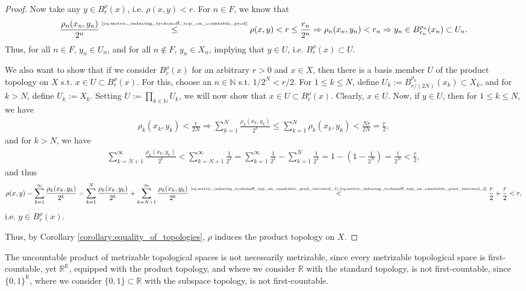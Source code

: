 \begin{proof}
	Now take any $y\in B_r^{\rho}(x)$, i.e. $\rho(x, y) < r$. For $n\in F$, we know that $$\frac{\rho_n(x_n, y_n) }{2^n} \overset{\tiny\eqref{eq:metric_inducing_tychonoff_top_on_countable_prod}}{\leq} \rho(x, y) < r \leq \frac{r_n}{2^n}\Rightarrow \rho_n(x_n, y_n) < r_n\Rightarrow y_n\in B_{r_n}^{\rho_n}(x_n) \subset U_n.$$
	Thus, for all $n\in F$, $y_n\in U_n$, and for all $n\notin F$, $y_n\in X_n$, implying that $y\in U$, i.e. $B_{r}^{\rho}(x)\subset U$.
	
	We also want to show that if we consider $B^{\rho}_{r}(x)$ for an arbitrary $r > 0$ and $x\in X$, then there is a basis member $U$ of the product topology on $X$ s.t. $x\in U\subset B^{\rho}_{r}(x)$. For this, choose an $n\in\mathbb N$ s.t. $1/2^N < r/2$. For $1\leq k\leq N$, define $U_k := B^{\rho_k}_{r/(2N)}(x_k) \subset X_k$, and for $k > N$, define $U_k := X_k$. Setting $U := \prod_{k\in \mathbb N}U_k$, we will now show that $x\in U\subset B^{\rho}_{r}(x)$. Clearly, $x\in U$. Now, if $y\in U$, then for $1\leq k\leq N$, we have
	\begin{align}\label{eq:metric_inducing_tychonoff_top_on_countable_prod_intermed_1}
		\rho_k(x_k, y_k) < \frac{r}{2N}\Rightarrow \sum_{k=1}^{N}\frac{\rho_k(x_k, y_k)}{2^k} \leq \sum_{k=1}^{N}\rho_k(x_k, y_k) < \frac{Nr}{2N} = \frac{r}{2},
	\end{align}
	and for $k > N$, we have 
	\begin{align}\label{eq:metric_inducing_tychonoff_top_on_countable_prod_intermed_2}
		\sum_{k = N + 1}^{\infty}\frac{\rho_k(x_k, y_k)}{2^k} < \sum_{k = N + 1}^{\infty}\frac{1}{2^k} = \sum_{k=1}^{\infty}\frac{1}{2^k} - \sum_{k=1}^{N}\frac{1}{2^k} = 1 - \left(1 - \frac{1}{2^N}\right) = \frac{1}{2^N} < \frac{r}{2},
	\end{align}
	and thus 
	\begin{align*}
		\rho(x, y) = \sum_{k=1}^{\infty}\frac{\rho_k(x_k, y_k)}{2^k} = \sum_{k=1}^{N}\frac{\rho_k(x_k, y_k)}{2^k} + \sum_{k=N+1}^{\infty}\frac{\rho_k(x_k, y_k)}{2^k} \overset{\tiny\eqref{eq:metric_inducing_tychonoff_top_on_countable_prod_intermed_1}, \eqref{eq:metric_inducing_tychonoff_top_on_countable_prod_intermed_2}}{<} \frac{r}{2} + \frac{r}{2} < r,
	\end{align*}
	i.e. $y\in B_r^{\rho}(x)$. 
	
	Thus, by Corollary \ref{corollary:equality_of_topologies}, $\rho$ induces the product topology on $X$.
\end{proof}

\begin{remark}
	The uncountable product of metrizable topological spaces is not necessarily metrizable, since every metrizable topological space is first-countable, yet $\mathbb R^{\mathbb R}$, equipped with the product topology, and where we consider $\mathbb R$ with the standard topology, is not first-countable, since $\{0, 1\}^{\mathbb R}$, where we consider $\{0, 1\}\subset \mathbb R$ with the subspace topology, is not first-countable.
\end{remark}

